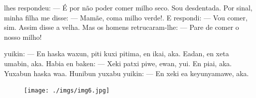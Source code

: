 
 lhes respondeu:
--- É por não poder comer milho
seco. Sou desdentada. Por
sinal, minha filha me disse:
--- Mamãe, coma milho verde!. E
respondi: --- Vou comer, sim.
Assim disse a velha. Mas os
homens retrucaram-lhe:
--- Pare de comer o nosso milho!

\vspace{2em}

 yuikin:
--- En haska waxun, piti kuxi
pitima, en ikai, aka. Eadan,
en xeta umabin, aka.
Habia en baken:
--- Xeki patxi piwe, ewan,
yui. En piai, aka.
Yuxabun haska waa.
Hunibun yuxabu yuikin:
--- En xeki ea keyunyamawe, aka.

\vspace*{\fill}

\pagebreak
\thispagestyle{empty}
\begin{figure}
\vspace*{-1.6cm}
\hspace*{-2.2cm}\texttt{[image: ./imgs/img6.jpg]}
\end{figure}

\chapter*{}

\mbox{}\vspace*{\fill}



